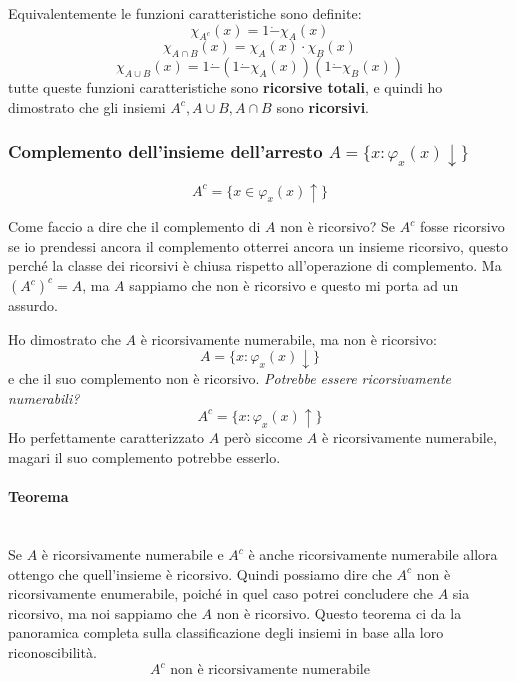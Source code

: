 \documentclass{article}
\begin{document}
Equivalentemente le funzioni caratteristiche sono definite:
$$\chi_{A^c}(x)=1\dot{-}\chi_A(x)$$
$$\chi_{A\cap B}(x)=\chi_A(x)\cdot\chi_B(x)$$
$$\chi_{A\cup B}(x)=1\dot{-}(1\dot{-}\chi_A(x))(1\dot{-}\chi_B(x))$$
tutte queste funzioni caratteristiche sono \textbf{ricorsive totali},
e quindi ho dimostrato che gli insiemi $A^c,A\cup B, A\cap B$ sono \textbf{ricorsivi}.

\subsubsection{Complemento dell'insieme dell'arresto $A=\{x:\varphi_x(x)\downarrow\}$}
$$A^c=\{x\in\varphi_x(x)\uparrow\}$$

Come faccio a dire che il complemento di $A$ non è ricorsivo? Se $A^c$ fosse
ricorsivo se io prendessi ancora il complemento otterrei ancora un insieme ricorsivo,
questo perché la classe dei ricorsivi è chiusa rispetto all'operazione di complemento.
Ma $(A^c)^c=A$, ma $A$ sappiamo che non è ricorsivo e questo mi porta ad un assurdo.

Ho dimostrato che $A$ è ricorsivamente numerabile, ma non è ricorsivo:
$$A=\{x:\varphi_x(x)\downarrow\}$$
e che il suo complemento non è ricorsivo. \textit{Potrebbe essere ricorsivamente
    numerabili?}
$$A^c=\{x:\varphi_x(x)\uparrow\}$$
Ho perfettamente caratterizzato $A$ però siccome $A$ è ricorsivamente numerabile,
magari il suo complemento potrebbe esserlo.

\paragraph{Teorema}\mbox{}\\
Se $A$ è ricorsivamente numerabile e $A^c$ è anche ricorsivamente numerabile allora ottengo
che quell'insieme è ricorsivo. Quindi possiamo dire che $A^c$ non è ricorsivamente
enumerabile, poiché in quel caso potrei concludere che $A$ sia ricorsivo, ma noi sappiamo
che $A$ non è ricorsivo.
Questo teorema ci da la panoramica completa sulla classificazione degli insiemi in base alla
loro riconoscibilità.
$$A^c\text{ non è ricorsivamente numerabile}$$
\end{document}
